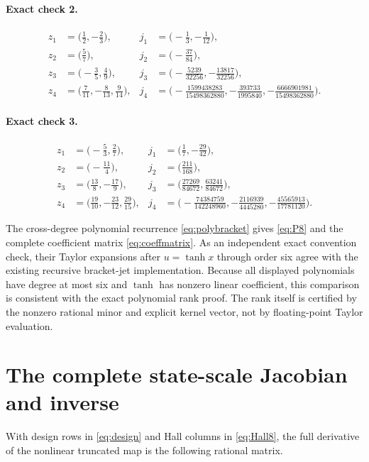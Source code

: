 \documentclass[11pt,a4paper]{article}
\numberwithin{equation}{section}
\theoremstyle{definition}
\theoremstyle{remark}
\begin{document}
\paragraph{Exact check 2.}
\begin{align*}
z_1&=\bigl(\frac{1}{2},-\frac{2}{3}\bigr),&j_1&=\bigl(-\frac{1}{3},-\frac{1}{12}\bigr),\\
z_2&=\bigl(\frac{5}{7}\bigr),&j_2&=\bigl(-\frac{37}{84}\bigr),\\
z_3&=\bigl(-\frac{3}{5},\frac{4}{9}\bigr),&j_3&=\bigl(-\frac{5239}{32256},-\frac{13817}{32256}\bigr),\\
z_4&=\bigl(\frac{7}{11},-\frac{8}{13},\frac{9}{14}\bigr),&j_4&=\bigl(-\frac{1599438283}{15498362880},-\frac{393733}{1995840},-\frac{6666901981}{15498362880}\bigr).
\end{align*}
\paragraph{Exact check 3.}
\begin{align*}
z_1&=\bigl(-\frac{5}{3},\frac{2}{7}\bigr),&j_1&=\bigl(\frac{1}{7},-\frac{29}{42}\bigr),\\
z_2&=\bigl(-\frac{11}{4}\bigr),&j_2&=\bigl(\frac{211}{168}\bigr),\\
z_3&=\bigl(\frac{13}{8},-\frac{17}{9}\bigr),&j_3&=\bigl(\frac{27269}{84672},\frac{63241}{84672}\bigr),\\
z_4&=\bigl(\frac{19}{10},-\frac{23}{12},\frac{29}{15}\bigr),&j_4&=\bigl(-\frac{74384759}{142248960},-\frac{2116939}{4445280},-\frac{45565913}{17781120}\bigr).
\end{align*}

The cross-degree polynomial recurrence \eqref{eq:polybracket} gives
\eqref{eq:P8} and the complete coefficient matrix \eqref{eq:coeffmatrix}.
As an independent exact convention check, their Taylor expansions after
$u=\tanh x$ through order six agree with the existing recursive bracket-jet
implementation. Because all displayed polynomials have degree at most six
and $\tanh$ has nonzero linear coefficient, this comparison is consistent
with the exact polynomial rank proof. The rank itself is certified by the
nonzero rational minor and explicit kernel vector, not by floating-point
Taylor evaluation.

\section{The complete state-scale Jacobian and inverse}
\label{app:inverse}
With design rows in \eqref{eq:design} and Hall columns in
\eqref{eq:Hall8}, the full derivative of the nonlinear truncated map is
the following rational matrix.
\end{document}
